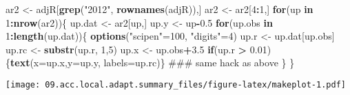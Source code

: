 \documentclass[]{article}
\newenvironment{Shaded}{\begin{snugshade}}{\end{snugshade}}
\newcommand{\KeywordTok}[1]{\textcolor[rgb]{0.13,0.29,0.53}{\textbf{#1}}}
\newcommand{\DataTypeTok}[1]{\textcolor[rgb]{0.13,0.29,0.53}{#1}}
\newcommand{\DecValTok}[1]{\textcolor[rgb]{0.00,0.00,0.81}{#1}}
\newcommand{\FloatTok}[1]{\textcolor[rgb]{0.00,0.00,0.81}{#1}}
\newcommand{\StringTok}[1]{\textcolor[rgb]{0.31,0.60,0.02}{#1}}
\newcommand{\ControlFlowTok}[1]{\textcolor[rgb]{0.13,0.29,0.53}{\textbf{#1}}}
\newcommand{\OperatorTok}[1]{\textcolor[rgb]{0.81,0.36,0.00}{\textbf{#1}}}
\newcommand{\NormalTok}[1]{#1}
\begin{document}
\begin{Shaded}
\begin{Highlighting}[]
\NormalTok{ar2 <-}\StringTok{ }\NormalTok{adjR[}\KeywordTok{grep}\NormalTok{(}\StringTok{"2012"}\NormalTok{, }\KeywordTok{rownames}\NormalTok{(adjR)),]}
\NormalTok{ar2 <-}\StringTok{ }\NormalTok{ar2[}\DecValTok{4}\OperatorTok{:}\DecValTok{1}\NormalTok{,]}
\ControlFlowTok{for}\NormalTok{(up }\ControlFlowTok{in} \DecValTok{1}\OperatorTok{:}\KeywordTok{nrow}\NormalTok{(ar2))\{}
\NormalTok{  up.dat <-}\StringTok{ }\NormalTok{ar2[up,]}
\NormalTok{  up.y <-}\StringTok{ }\NormalTok{up}\OperatorTok{-}\FloatTok{0.5}
  \ControlFlowTok{for}\NormalTok{(up.obs }\ControlFlowTok{in} \DecValTok{1}\OperatorTok{:}\KeywordTok{length}\NormalTok{(up.dat))\{}
    \KeywordTok{options}\NormalTok{(}\StringTok{"scipen"}\NormalTok{=}\DecValTok{100}\NormalTok{, }\StringTok{"digits"}\NormalTok{=}\DecValTok{4}\NormalTok{)}
\NormalTok{    up.r <-}\StringTok{ }\NormalTok{up.dat[up.obs]}
\NormalTok{    up.rc <-}\StringTok{ }\KeywordTok{substr}\NormalTok{(up.r, }\DecValTok{1}\NormalTok{,}\DecValTok{5}\NormalTok{)}
\NormalTok{    up.x <-}\StringTok{ }\NormalTok{up.obs}\OperatorTok{+}\FloatTok{3.5}
    \ControlFlowTok{if}\NormalTok{(up.r }\OperatorTok{>}\StringTok{ }\FloatTok{0.01}\NormalTok{)\{}\KeywordTok{text}\NormalTok{(}\DataTypeTok{x=}\NormalTok{up.x,}\DataTypeTok{y=}\NormalTok{up.y, }\DataTypeTok{labels=}\NormalTok{up.rc)\} ### same hack as above}
\NormalTok{  \}}
\NormalTok{\}}
\end{Highlighting}
\end{Shaded}

\texttt{[image: 09.acc.local.adapt.summary\_files/figure-latex/makeplot-1.pdf]}
\end{document}
